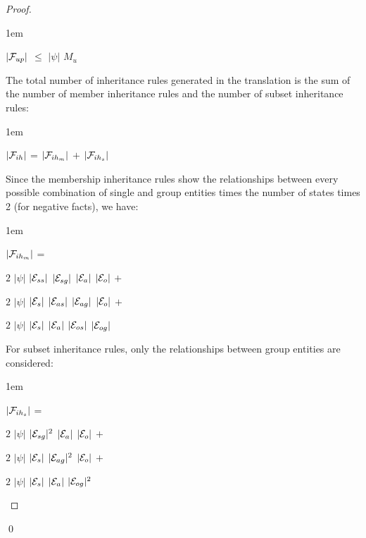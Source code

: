 \documentclass[glov2,twocolumn,final]{svjour2}
\newenvironment{vproof}
  {\begin{proof}\hspace{0.1em}}
  {\end{proof}\qed}
\newenvironment{vquote}
  {\begin{list}{}{\leftmargin 1em}\item[]}
  {\end{list}}
\begin{document}
\begin{vproof}
          \begin{vquote}
            $|{\cal F}_{up}|$ $\leq$ $|\psi|$ $M_{u}$
          \end{vquote}

          The total number of inheritance rules generated in the translation is
          the sum of the number of member inheritance rules and the number of
          subset inheritance rules:

          \begin{vquote}
            $|{\cal F}_{ih}|$ =
            $|{\cal F}_{ih_{m}}|$ $+$
            $|{\cal F}_{ih_{s}}|$
          \end{vquote}

          Since the membership inheritance rules show the relationships between
          every possible combination of single and group entities times the
          number of states times 2 (for negative facts), we have:

          \begin{vquote}
            $|{\cal F}_{ih_{m}}|$ =

            \hspace{1em}
            $2$ $|\psi|$ $|{\cal E}_{ss}|$ $|{\cal E}_{sg}|$ $|{\cal E}_{a}|$ $|{\cal E}_{o}|$ $+$

            \hspace{1em}
            $2$ $|\psi|$ $|{\cal E}_{s}|$ $|{\cal E}_{as}|$ $|{\cal E}_{ag}|$ $|{\cal E}_{o}|$ $+$

            \hspace{1em}
            $2$ $|\psi|$ $|{\cal E}_{s}|$ $|{\cal E}_{a}|$ $|{\cal E}_{os}|$ $|{\cal E}_{og}|$
          \end{vquote}

          For subset inheritance rules, only the relationships between group
          entities are considered:

          \begin{vquote}
            $|{\cal F}_{ih_{s}}|$ =

            \hspace{1em}
            $2$ $|\psi|$ $|{\cal E}_{sg}|^{2}$ $|{\cal E}_{a}|$ $|{\cal E}_{o}|$ $+$

            \hspace{1em}
            $2$ $|\psi|$ $|{\cal E}_{s}|$ $|{\cal E}_{ag}|^{2}$ $|{\cal E}_{o}|$ $+$

            \hspace{1em}
            $2$ $|\psi|$ $|{\cal E}_{s}|$ $|{\cal E}_{a}|$ $|{\cal E}_{og}|^{2}$
          \end{vquote}


\end{vproof}
\end{document}
